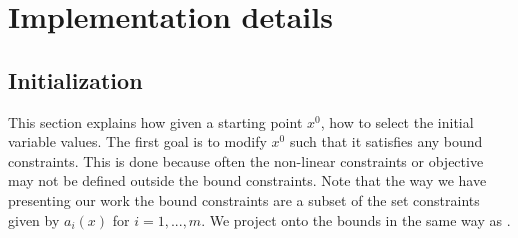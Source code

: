 \documentclass{article}
\begin{document}

\section{Implementation details}\label{sec:implementation-details}


\subsection{Initialization}\label{sec:initialization}
 
This section explains how given a starting point $x^{0}$, how to select the initial variable values. The first goal is to modify $x^{0}$ such that it satisfies any bound constraints. This is done because often the non-linear constraints or objective may not be defined outside the bound constraints. Note that the way we have presenting our work the bound constraints are a subset of the set constraints given by $a_i(x)$ for $i = 1, ..., m$. We project onto the bounds in the same way as \cite[Section 3.7]{wachter2006implementation}.

\end{document}
